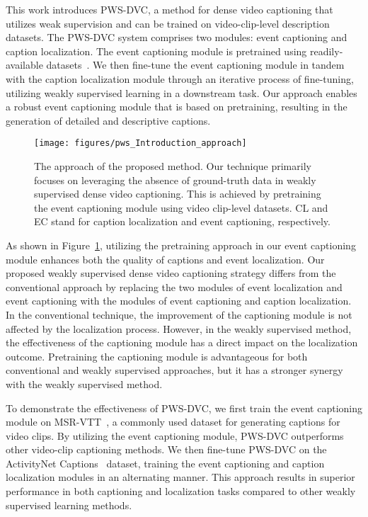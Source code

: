 This work introduces PWS-DVC, a method for dense video captioning that utilizes weak supervision and can be trained on video-clip-level description datasets.
The PWS-DVC system comprises two modules: event captioning and caption localization.
The event captioning module is pretrained using readily-available datasets~\cite{Wang2019-tk,Lei2020-rr,Chen2011-ai,Bain2021-si,Xu2016-ti}.
We then fine-tune the event captioning module in tandem with the caption localization module through an iterative process of fine-tuning, utilizing weakly supervised learning in a downstream task.
Our approach enables a robust event captioning module that is based on pretraining, resulting in the generation of detailed and descriptive captions.

\begin{figure}[t]
    \centering
    \texttt{[image: figures/pws\_Introduction\_approach]}
    \caption{The approach of the proposed method. Our technique primarily focuses on leveraging the absence of ground-truth data in weakly supervised dense video captioning.
        This is achieved by pretraining the event captioning module using video clip-level datasets.
        CL and EC stand for caption localization and event captioning, respectively.}
    \label{fig:approach}
\end{figure}

As shown in Figure~\ref{fig:approach}, utilizing the pretraining approach in our event captioning module enhances both the quality of captions and event localization.
Our proposed weakly supervised dense video captioning strategy differs from the conventional approach by replacing the two modules of event localization and event captioning with the modules of event captioning and caption localization.
In the conventional technique, the improvement of the captioning module is not affected by the localization process.
However, in the weakly supervised method, the effectiveness of the captioning module has a direct impact on the localization outcome.
Pretraining the captioning module is advantageous for both conventional and weakly supervised approaches, but it has a stronger synergy with the weakly supervised method.

To demonstrate the effectiveness of PWS-DVC, we first train the event captioning module on MSR-VTT~\cite{Xu2016-ti}, a commonly used dataset for generating captions for video clips.
By utilizing the event captioning module, PWS-DVC outperforms other video-clip captioning methods.
We then fine-tune PWS-DVC on the ActivityNet Captions~\cite{Krishna2017-pw} dataset, training the event captioning and caption localization modules in an alternating manner.
This approach results in superior performance in both captioning and localization tasks compared to other weakly supervised learning methods.

